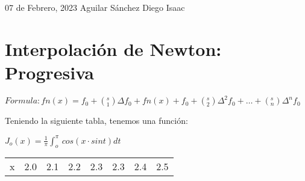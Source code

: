 \documentclass[12pt]{article}
\begin{document}
\begin{flushright}
    07 de Febrero, 2023 \linebreak
    Aguilar Sánchez Diego Isaac
\end{flushright}
\section*{Interpolación de Newton: Progresiva}
    \begin{center}
        \begin{math}
            Formula: fn(x) = f_{0} + (^{s}_{1}) \Delta f_{0} + fn(x) + f_{0} + (^{s}_{2}) \Delta^{2} f_{0} + \dots + (_{n}^{s}) \Delta^{n}f_{0}
        \end{math}
    \end{center}
    
    Teniendo la siguiente tabla, tenemos una función:
    \begin{center}
        \begin{math}
            J_{o}(x) = \frac{1}{\pi} \int_{o}^{\pi}  \,cos(x \cdot sint)dt 
        \end{math}
    \end{center}
    \begin{tabular}{ c c c c c c }
        \hline
        x & 2.0 & 2.1 & 2.2 & 2.3 & 2.3 & 2.4 & 2.5
        \hline
    \end{tabular}
\end{document}
